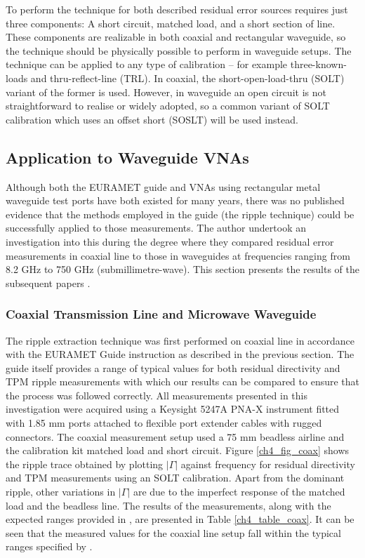 \documentclass[../thesis/thesis.tex]{subfiles}
\begin{document}
\begin{refsection}
To perform the technique for both described residual error sources requires just three components: A short circuit, matched load, and a short section of line. These components are realizable in both coaxial and rectangular waveguide, so the technique should be physically possible to perform in waveguide setups. The technique can be applied to any type of calibration – for example three-known-loads and thru-reflect-line (TRL). In coaxial, the short-open-load-thru (SOLT) variant of the former is used. However, in waveguide an open circuit is not straightforward to realise or widely adopted, so a common variant of SOLT calibration which uses an offset short (SOSLT) will be used instead.

\subsection{Application to Waveguide VNAs}

Although both the EURAMET guide and VNAs using rectangular metal waveguide test ports have both existed for many years, there was no published evidence that the methods employed in the guide (the ripple technique) could be successfully applied to those measurements. The author undertook an investigation into this during the degree where they compared residual error measurements in coaxial line to those in waveguides at frequencies ranging from 8.2 GHz to 750 GHz (submillimetre-wave). This section presents the results of the subsequent papers \cite{Stant_2016_Coll, Stant_2017}.

\subsubsection{Coaxial Transmission Line and Microwave Waveguide}

The ripple extraction technique was first performed on coaxial line in accordance with the EURAMET Guide \cite{EURAMET_2011} instruction as described in the previous section. The guide itself provides a range of typical values for both residual directivity and TPM ripple measurements with which our results can be compared to ensure that the process was followed correctly. All measurements presented in this investigation were acquired using a Keysight 5247A PNA-X instrument fitted with 1.85 mm ports attached to flexible port extender cables with rugged connectors. The coaxial measurement setup used a 75 mm beadless airline and the calibration kit matched load and short circuit. Figure \ref{ch4_fig_coax} shows the ripple trace obtained by plotting $|\Gamma|$ against frequency for residual directivity and TPM measurements using an SOLT calibration. Apart from the dominant ripple, other variations in $|\Gamma|$ are due to the imperfect response of the matched load and the beadless line. The results of the measurements, along with the expected ranges provided in \cite{EURAMET_2011}, are presented in Table \ref{ch4_table_coax}. It can be seen that the measured values for the coaxial line setup fall within the typical ranges specified by \cite{EURAMET_2011}.


\end{refsection}
\end{document}
